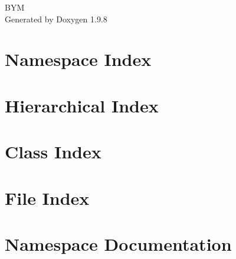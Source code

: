 \documentclass[twoside]{book}
\newcommand{\+}{\discretionary{\mbox{\scriptsize$\hookleftarrow$}}{}{}}
\newcommand{\clearemptydoublepage}{%
    \newpage{\pagestyle{empty}\cleardoublepage}%
  }
\begin{document}
  \raggedbottom
  \begin{titlepage}
  \vspace*{7cm}
  \begin{center}%
  {\Large BYM}\\
  \vspace*{1cm}
  {\large Generated by Doxygen 1.9.8}\\
  \end{center}
  \end{titlepage}
  \clearemptydoublepage
  \tableofcontents
  \clearemptydoublepage
\chapter{Namespace Index}

\chapter{Hierarchical Index}

\chapter{Class Index}

\chapter{File Index}

\chapter{Namespace Documentation}

















\end{document}
